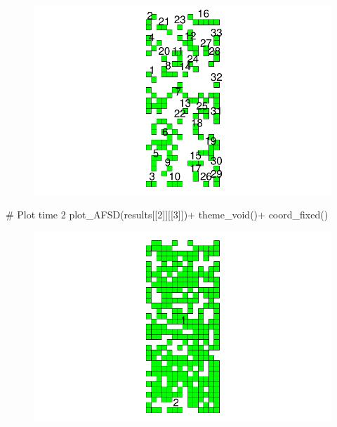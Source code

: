 \documentclass[
  letterpaper,
  DIV=11,
  numbers=noendperiod]{scrreprt}
\newenvironment{Shaded}{\begin{snugshade}}{\end{snugshade}}
\newcommand{\CommentTok}[1]{\textcolor[rgb]{0.37,0.37,0.37}{#1}}
\newcommand{\DecValTok}[1]{\textcolor[rgb]{0.68,0.00,0.00}{#1}}
\newcommand{\FunctionTok}[1]{\textcolor[rgb]{0.28,0.35,0.67}{#1}}
\newcommand{\NormalTok}[1]{\textcolor[rgb]{0.00,0.23,0.31}{#1}}
\newcommand{\SpecialCharTok}[1]{\textcolor[rgb]{0.37,0.37,0.37}{#1}}
\begin{document}
\begin{figure}[H]

{\centering \includegraphics{spatial-tests_files/figure-pdf/unnamed-chunk-18-1.pdf}

}

\end{figure}

\begin{Shaded}
\begin{Highlighting}[]
\CommentTok{\# Plot time 2}
\FunctionTok{plot\_AFSD}\NormalTok{(results[[}\DecValTok{2}\NormalTok{]][[}\DecValTok{3}\NormalTok{]])}\SpecialCharTok{+}
  \FunctionTok{theme\_void}\NormalTok{()}\SpecialCharTok{+}
  \FunctionTok{coord\_fixed}\NormalTok{()}
\end{Highlighting}
\end{Shaded}

\begin{figure}[H]

{\centering \includegraphics{spatial-tests_files/figure-pdf/unnamed-chunk-18-2.pdf}

}

\end{figure}
\end{document}
